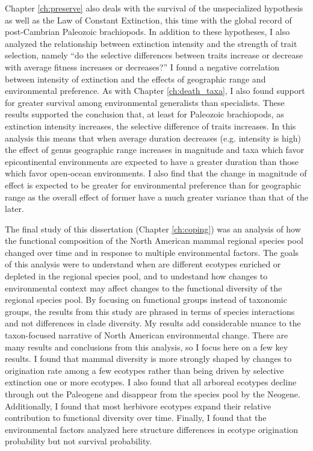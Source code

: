 Chapter \ref{ch:preserve} also deals with the survival of the unspecialized hypothesis as well as the Law of Constant Extinction, this time with the global record of post-Cambrian Paleozoic brachiopods. In addition to these hypotheses, I also analyzed the relationship between extinction intensity and the strength of trait selection, namely ``do the selective differences between traits increase or decrease with average fitness increases or decreases?'' I found a negative correlation between intensity of extinction and the effects of geographic range and environmental preference. As with Chapter \ref{ch:death_taxa}, I also found support for greater survival among environmental generalists than specialists. These results supported the conclusion that, at least for Paleozoic brachiopods, as extinction intensity increases, the selective difference of traits increases. In this analysis this means that when average duration decreases (e.g. intensity is high) the effect of genus geographic range increases in magnitude and taxa which favor epicontinental environments are expected to have a greater duration than those which favor open-ocean environments. I also find that the change in magnitude of effect is expected to be greater for environmental preference than for geographic range as the overall effect of former have a much greater variance than that of the later.

The final study of this dissertation (Chapter \ref{ch:coping}) was an analysis of how the functional composition of the North American mammal regional species pool changed over time and in response to multiple environmental factors. The goals of this analysis were to understand when are different ecotypes enriched or depleted in the regional species pool, and to undestand how changes to environmental context may affect changes to the functional diversity of the regional species pool. By focusing on functional groups instead of taxonomic groups, the results from this study are phrased in terms of species interactions and not differences in clade diversity. My results add considerable nuance to the taxon-focused narrative of North American environmental change. There are many results and conclusions from this analysis, so I focus here on a few key results. I found that mammal diversity is more strongly shaped by changes to origination rate among a few ecotypes rather than being driven by selective extinction one or more ecotypes. I also found that all arboreal ecotypes decline through out the Paleogene and disappear from the species pool by the Neogene. Additionally, I found that most herbivore ecotypes expand their relative contribution to functional diversity over time. Finally, I found that the environmental factors analyzed here structure differences in ecotype origination probability but not survival probability.


